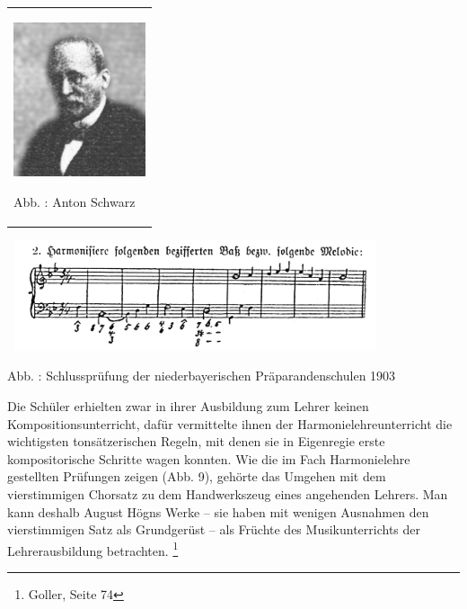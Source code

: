 \begin{center}
\begin{minipage}{4.269cm}
\begin{flushleft}
\tablefirsthead{}
\tablehead{}
\tabletail{}
\tablelasttail{}
\begin{supertabular}{m{4.0690002cm}}

\includegraphics[width=3.886cm,height=4.531cm]{pictures/zulassungsarbeit-img010.png}

Abb. : Anton Schwarz\\
\end{supertabular}
\end{flushleft}
\end{minipage}
\end{center}
{\centering

\includegraphics[width=11.088cm,height=3.258cm]{pictures/zulassungsarbeit-img011.png}
 \par}
{\centering
\label{bkm:Ref100298600}Abb. : Schlussprüfung
der niederbayerischen Präparandenschulen 1903
\par}

Die Schüler erhielten zwar in ihrer Ausbildung zum Lehrer keinen
Kompositionsunterricht, dafür vermittelte ihnen der
Harmonielehreunterricht die wichtigsten tonsätzerischen Regeln, mit
denen sie in Eigenregie erste kompositorische Schritte wagen konnten.
Wie die im Fach Harmonielehre gestellten Prüfungen zeigen (Abb. 9),
gehörte das Umgehen mit dem vierstimmigen Chorsatz zu dem Handwerkszeug
eines angehenden Lehrers. Man kann deshalb August Högns Werke – sie
haben mit wenigen Ausnahmen den vierstimmigen Satz als Grundgerüst –
als Früchte des Musikunterrichts der Lehrerausbildung
betrachten. \footnote{Goller, Seite 74}
